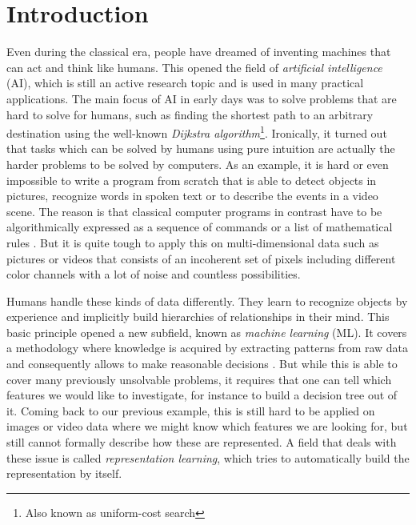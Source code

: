 

\chapter{Introduction} \label{chapter:introduction}

Even during the classical era, people have dreamed of inventing machines that can act and think like humans. This opened the field of \textit{artificial intelligence} (AI), which is still an active research topic and is used in many practical applications. The main focus of AI in early days was to solve problems that are hard to solve for humans, such as finding the shortest path to an arbitrary destination using the well-known \textit{Dijkstra algorithm}\footnote{Also known as uniform-cost search}. Ironically, it turned out that tasks which can be solved by humans using pure intuition are actually the harder problems to be solved by computers. As an example, it is hard or even impossible to write a program from scratch that is able to detect objects in pictures, recognize words in spoken text or to describe the events in a video scene. The reason is that classical computer programs in contrast have to be algorithmically expressed as a sequence of commands or a list of mathematical rules \parencite{deep_learning}. But it is quite tough to apply this on multi-dimensional data such as pictures or videos that consists of an incoherent set of pixels including different color channels with a lot of noise and countless possibilities. 

Humans handle these kinds of data differently. They learn to recognize objects by experience and implicitly build hierarchies of relationships in their mind. This basic principle opened a new subfield, known as \textit{machine learning} (ML). It covers a methodology where knowledge is acquired by extracting patterns from raw data and consequently allows to make reasonable decisions \parencite{deep_learning}. But while this is able to cover many previously unsolvable problems, it requires that one can tell which features we would like to investigate, for instance to build a decision tree out of it. Coming back to our previous example, this is still hard to be applied on images or video data where we might know which features we are looking for, but still cannot formally describe how these are represented. A field that deals with these issue is called \textit{representation learning}, which tries to automatically build the representation by itself.

